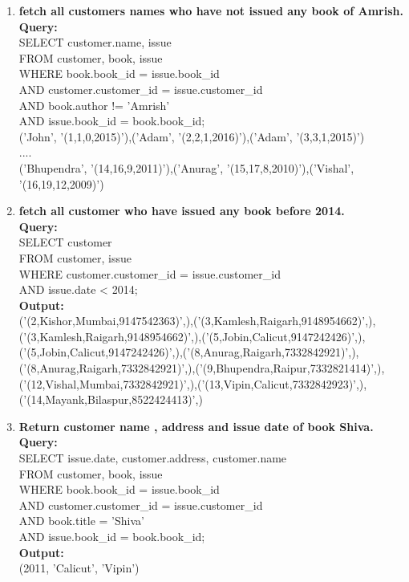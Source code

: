 \begin{enumerate}
\item \textbf{fetch all customers names  who have not issued any book of Amrish.}\\
\textbf{Query:}\\SELECT customer.name, issue\\
FROM customer, book, issue\\
WHERE book.book\_id = issue.book\_id\\
AND customer.customer\_id = issue.customer\_id\\
AND book.author != 'Amrish'\\ 
AND issue.book\_id = book.book\_id;\\
('John', '(1,1,0,2015)'),('Adam', '(2,2,1,2016)'),('Adam', '(3,3,1,2015)')\\
....\\
('Bhupendra', '(14,16,9,2011)'),('Anurag', '(15,17,8,2010)'),('Vishal', '(16,19,12,2009)')\\

\item \textbf{fetch all customer who have issued any book before 2014.}\\
\textbf{Query:}\\SELECT customer\\
FROM customer, issue\\
WHERE customer.customer\_id = issue.customer\_id \\
AND issue.date < 2014;\\
\textbf{Output:}\\
('(2,Kishor,Mumbai,9147542363)',),('(3,Kamlesh,Raigarh,9148954662)',),\\
('(3,Kamlesh,Raigarh,9148954662)',),('(5,Jobin,Calicut,9147242426)',),\\
('(5,Jobin,Calicut,9147242426)',),('(8,Anurag,Raigarh,7332842921)',),\\
('(8,Anurag,Raigarh,7332842921)',),('(9,Bhupendra,Raipur,7332821414)',),\\
('(12,Vishal,Mumbai,7332842921)',),('(13,Vipin,Calicut,7332842923)',),\\
('(14,Mayank,Bilaspur,8522424413)',)

\item \textbf{Return customer name , address and issue date of book Shiva.}\\
\textbf{Query:}\\SELECT issue.date, customer.address, customer.name\\
FROM customer, book, issue\\
WHERE book.book\_id = issue.book\_id\\
AND customer.customer\_id = issue.customer\_id\\
AND book.title = 'Shiva'\\
AND issue.book\_id = book.book\_id;\\
\textbf{Output:}\\
(2011, 'Calicut', 'Vipin')


\end{enumerate}

